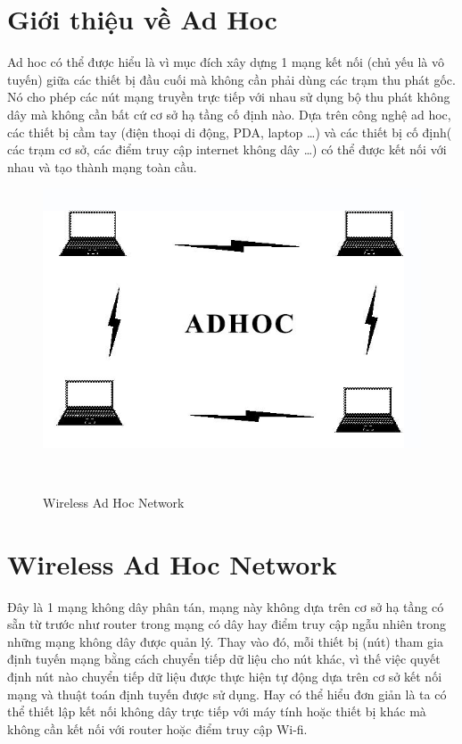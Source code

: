 \documentclass[12pt,a4paper]{report}
\begin{document}
\section{Giới thiệu về Ad Hoc}
\hspace{25pt} Ad hoc có thể được hiểu là vì mục đích xây dựng 1 mạng kết nối (chủ yếu là vô tuyến) giữa các thiết bị đầu cuối mà không cần phải dùng các trạm thu phát gốc. Nó cho phép các nút mạng truyền trực tiếp với nhau sử dụng bộ thu phát không dây mà không cần bất cứ cơ sở hạ tầng cố định nào. Dựa trên công nghệ ad hoc, các thiết bị cầm tay (điện thoại di động, PDA, laptop …) và các thiết bị cố định( các trạm cơ sở, các điểm truy cập internet không dây …) có thể được kết nối với nhau và tạo thành mạng toàn cầu.
\begin{figure}
	\begin{center}
		\includegraphics[scale=0.6]{Ad.png}	
	\end{center}
	\caption{Wireless Ad Hoc Network}
	\label{refhinh1.1}\
\end{figure}


\section{Wireless Ad Hoc Network}
\hspace{25pt} Đây là 1 mạng không dây phân tán, mạng này không dựa trên cơ sở hạ tầng có sẵn từ trước như router trong mạng có dây hay điểm truy cập ngẫu nhiên trong những mạng không dây được quản lý. Thay vào đó, mỗi thiết bị (nút) tham gia định tuyến mạng bằng cách chuyển tiếp dữ liệu cho nút khác, vì thế việc quyết định nút nào chuyển tiếp dữ liệu được thực hiện tự động dựa trên cơ sở kết nối mạng và thuật toán định tuyến được sử dụng. Hay có thể hiểu đơn giản là ta có thể thiết lập kết nối không dây trực tiếp với máy tính hoặc thiết bị khác mà không cần kết nối với router hoặc điểm truy cập Wi-fi.
\end{document}
